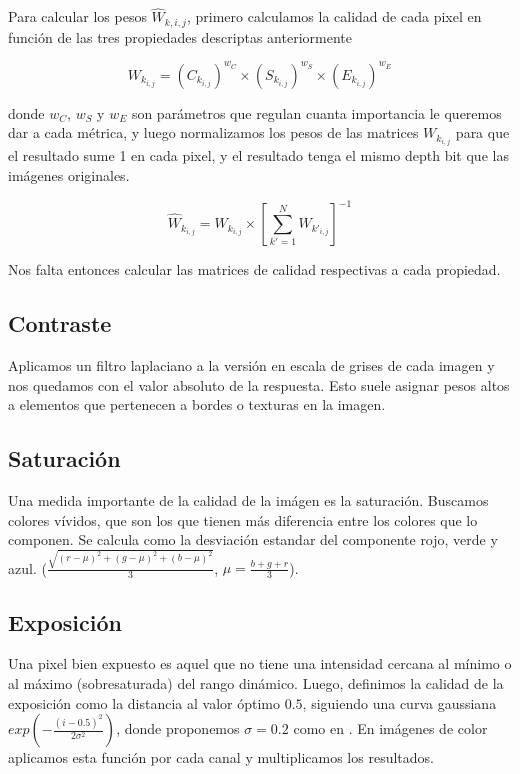 \documentclass[a4paper,10pt]{article}
\begin{document}
        Para calcular los pesos $\hat{W}_{k,i,j}$, primero calculamos la calidad de cada pixel en función de las tres propiedades descriptas anteriormente

        $$ W_{k_{i,j}} = (C_{k_{i,j}})^{w_C} \times (S_{k_{i,j}})^{w_S} \times (E_{k_{i,j}})^{w_E} $$

        donde $w_C$, $w_S$ y $w_E$ son parámetros que regulan cuanta importancia le queremos dar a cada métrica, y luego normalizamos los pesos de las matrices $W_{k_{i,j}}$ para que el resultado sume 1 en cada pixel, y el resultado tenga el mismo depth bit que las imágenes originales.

        $$ \hat{W}_{k_{i,j}} = W_{k_{i,j}} \times [\sum_{k'=1}^N{W_{k'_{i,j}}}]^{-1} $$ 

        Nos falta entonces calcular las matrices de calidad respectivas a cada propiedad.

        \subsection{Contraste}

            Aplicamos un filtro laplaciano a la versión en escala de grises de cada imagen y nos quedamos con el valor absoluto de la respuesta. Esto suele asignar pesos altos a elementos que pertenecen a bordes o texturas en la imagen.

        \subsection{Saturación}

            Una medida importante de la calidad de la imágen es la saturación. Buscamos colores vívidos, que son los que tienen más diferencia entre los colores que lo componen. Se calcula como la desviación estandar del componente rojo, verde y azul. ($\frac{\sqrt{(r-\mu)^2 + (g-\mu)^2 + (b-\mu)^2}}{3}$, $\mu = \frac{b+g+r}{3}$).

        \subsection{Exposición}

            Una pixel bien expuesto es aquel que no tiene una intensidad cercana al mínimo o al máximo (sobresaturada) del rango dinámico. Luego, definimos la calidad de la exposición como la distancia al valor óptimo $0.5$, siguiendo una curva gaussiana $exp(-\frac{(i-0.5)^2}{2\sigma^2})$, donde proponemos $\sigma = 0.2$ como en \cite{DBLP:conf/pg/MertensKR07}. En imágenes de color aplicamos esta función por cada canal y multiplicamos los resultados.
\end{document}
